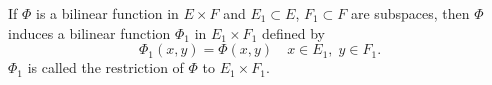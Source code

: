 If $\Phi$ is a bilinear function in $E \times F$ and $E_1 \subset E$, $F_1 \subset F$ are subspaces, then $\Phi$ induces a bilinear function $\Phi_1$ in $E_1 \times F_1$ defined by
$$\Phi_1(x, y) = \Phi(x, y) \quad x \in E_1, \; y \in F_1.$$
$\Phi_1$ is called the restriction of $\Phi$ to $E_1 \times F_1$.
